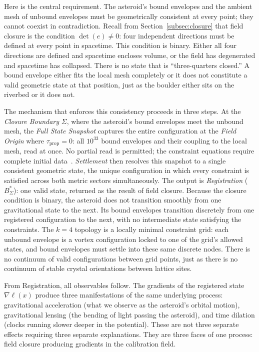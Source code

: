 \documentclass[aps,prd,preprint,superscriptaddress,showpacs,preprintnumbers,amsmath,amssymb,nofootinbib]{revtex4-2}
\begin{document}
Here is the central requirement. The asteroid's bound envelopes and the ambient mesh of unbound envelopes must be geometrically consistent at every point; they cannot coexist in contradiction. Recall from Section~\ref{subsec:closure} that field closure is the condition $\det(e) \neq 0$: four independent directions must be defined at every point in spacetime. This condition is binary. Either all four directions are defined and spacetime encloses volume, or the field has degenerated and spacetime has collapsed. There is no state that is ``three-quarters closed.'' A bound envelope either fits the local mesh completely or it does not constitute a valid geometric state at that position, just as the boulder either sits on the riverbed or it does not.

The mechanism that enforces this consistency proceeds in three steps. At the \emph{Closure Boundary} $\Sigma$, where the asteroid's bound envelopes meet the unbound mesh, the \emph{Full State Snapshot} captures the entire configuration at the \emph{Field Origin} where $\tau_{\text{prop}} = 0$: all $10^{33}$ bound envelopes and their coupling to the local mesh, read at once. No partial read is permitted; the constraint equations require complete initial data~\cite{choquetbruhat1952}. \emph{Settlement} then resolves this snapshot to a single consistent geometric state, the unique configuration in which every constraint is satisfied across both metric sectors simultaneously. The output is \emph{Registration} ($B^*_\Sigma$): one valid state, returned as the result of field closure. Because the closure condition is binary, the asteroid does not transition smoothly from one gravitational state to the next. Its bound envelopes transition discretely from one registered configuration to the next, with no intermediate state satisfying the constraints. The $k = 4$ topology is a locally minimal constraint grid: each unbound envelope is a vortex configuration locked to one of the grid's allowed states, and bound envelopes must settle into these same discrete nodes. There is no continuum of valid configurations between grid points, just as there is no continuum of stable crystal orientations between lattice sites.

From Registration, all observables follow. The gradients of the registered state $\nabla\ell(x)$ produce three manifestations of the same underlying process: gravitational acceleration (what we observe as the asteroid's orbital motion), gravitational lensing (the bending of light passing the asteroid), and time dilation (clocks running slower deeper in the potential). These are not three separate effects requiring three separate explanations. They are three faces of one process: field closure producing gradients in the calibration field.
\end{document}

